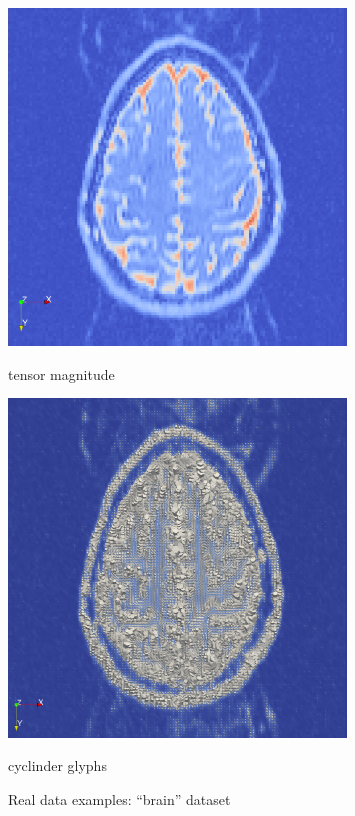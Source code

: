 \documentclass{scrartcl}
\begin{document}
\begin{figure}[!t]
\centering
  \begin{minipage}{0.4\textwidth}
    \includegraphics[width=0.8\textwidth]{img/brain_org.png}
    \label{a)}
    \caption*{tensor magnitude}
  \end{minipage}
  \begin{minipage}{0.4\textwidth}
    \includegraphics[width=0.8\textwidth]{img/brain_cyl_glyphs.png}
    \label{b)}
    \caption*{cyclinder glyphs}
  \end{minipage}
\caption{Real data examples: \enquote{brain} dataset}
\label{real1}
\end{figure}
\end{document}
